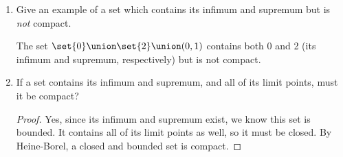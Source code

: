 \documentclass{article}
\begin{document}
\begin{enumerate}
\begin{enumerate}
          \item Give an example of a set which contains its infimum and supremum but is \emph{not} compact.

                The set $\set{0} \union \set{2} \union (0, 1)$ contains both 0 and 2 (its infimum and supremum, respectively)
                but is not compact.


          \item If a set contains its infimum and supremum, and all of its limit points, must it be compact?
                \begin{proof}
                  Yes, since its infimum and supremum exist, we know this set is bounded. It contains all of its limit points as well,
                  so it must be closed. By Heine-Borel, a closed and bounded set is compact.
                \end{proof}

        \end{enumerate}
\end{enumerate}
\end{document}
